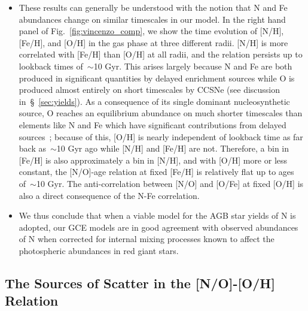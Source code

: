 \documentclass[ms.tex]{subfiles}
\begin{document}
\begin{itemize}
	\item These results can generally be understood with the notion that 
	N and Fe abundances change on similar timescales in our model. 
	In the right hand panel of Fig.~\ref{fig:vincenzo_comp}, we show the time 
	evolution of [N/H], [Fe/H], and [O/H] in the gas phase at three different 
	radii. 
	[N/H] is more correlated with [Fe/H] than [O/H] at all radii, and the 
	relation persists up to lookback times of~$\sim$10 Gyr. 
	This arises largely because N and Fe are both produced in significant 
	quantities by delayed enrichment sources while O is produced almost 
	entirely on short timescales by CCSNe (see discussion 
	in~\S~\ref{sec:yields}). 
	As a consequence of its single dominant nucleosynthetic source, O reaches 
	an equilibrium abundance on much shorter timescales than elements like N 
	and Fe which have significant contributions from delayed 
	sources~\citep{Weinberg2017}; because of this, [O/H] is nearly 
	independent of lookback time as far back as~$\sim$10 Gyr ago while [N/H] 
	and [Fe/H] are not. 
	Therefore, a bin in [Fe/H] is also approximately a bin in [N/H], and with 
	[O/H] more or less constant, the [N/O]-age relation at fixed [Fe/H] is 
	relatively flat up to ages of~$\sim$10 Gyr. 
	The anti-correlation between [N/O] and [O/Fe] at fixed [O/H] is also a 
	direct consequence of the N-Fe correlation. 

	\item We thus conclude that when a viable model for the AGB star yields of 
	N is adopted, our GCE models are in good agreement with observed abundances 
	of N when corrected for internal mixing processes known to affect the 
	photospheric abundances in red giant stars. 
\end{itemize} 

\subsection{The Sources of Scatter in the [N/O]-[O/H] Relation} 
\label{sec:results:schaefer_comp} 
\end{document}
